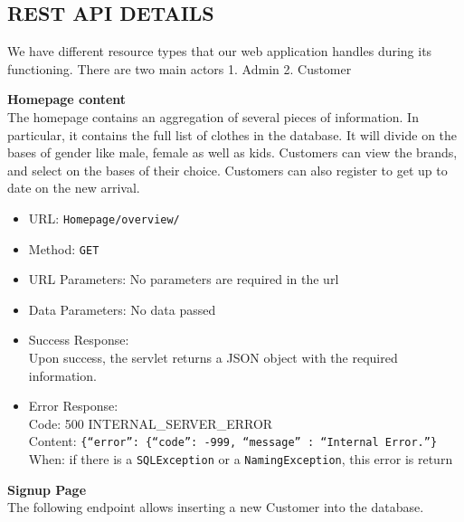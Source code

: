 \subsection{REST API DETAILS}

We have different resource types that our web application handles during its functioning.
There are two main actors 
1. Admin
2. Customer

\noindent\textbf{Homepage content}\\
The homepage contains an aggregation of several pieces of information. In particular, it contains the
full list of clothes in the database. It will divide on the bases of gender like male, female as well as kids. Customers can view the brands, and select on the bases of their choice. Customers can also register to get up to date on the new arrival. 

\begin{itemize}
    \item URL: \texttt{Homepage/overview/}
    \item Method: \texttt{GET}
    \item URL Parameters: No parameters are required in the url
    \item Data Parameters: No data passed
    \item Success Response:\\
    Upon success, the servlet returns a JSON object with the required information.

    \item Error Response:\\
    Code: 500 INTERNAL\_SERVER\_ERROR\\
    Content: \texttt{\{``error'': \{``code'': -999, ``message'' : ``Internal Error.''\}}\\
    When: if there is a \texttt{SQLException} or a \texttt{NamingException}, this error is return
\end{itemize}


\noindent\textbf{Signup Page}\\
The following endpoint allows inserting a new Customer into the database.

